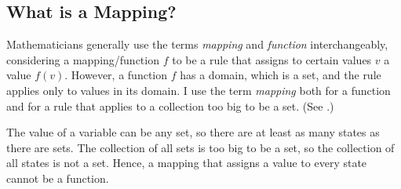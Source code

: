 \documentclass[fleqn,leqno]{article}
\begin{document}
\subsection*{What is a Mapping?}

Mathematicians 
generally use the terms \emph{mapping} and \emph{function}
interchangeably, considering a mapping/function $f$ to be a rule that
assigns to certain values $v$ a value $f(v)$.  However, a function $f$
has a domain, which is a set, and the rule applies only to values in
its domain.  I use the term \emph{mapping} both
for a function and for a rule that applies to
a collection too big to be a set.  (See
  .)

The value of a variable can be any set, so there are at least as many
states as there are sets.  The collection of all sets is too big to be
a set, so the collection of all states is not a set.  Hence, a mapping
that assigns a value to every state cannot be a function.
\end{document}
